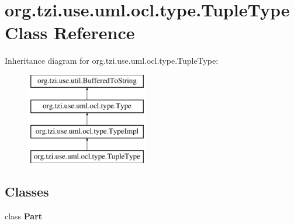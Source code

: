 \hypertarget{classorg_1_1tzi_1_1use_1_1uml_1_1ocl_1_1type_1_1_tuple_type}{\section{org.\-tzi.\-use.\-uml.\-ocl.\-type.\-Tuple\-Type Class Reference}
\label{classorg_1_1tzi_1_1use_1_1uml_1_1ocl_1_1type_1_1_tuple_type}
}
Inheritance diagram for org.\-tzi.\-use.\-uml.\-ocl.\-type.\-Tuple\-Type\-:\begin{figure}[H]
\begin{center}
\leavevmode
\includegraphics[height=4.000000cm]{classorg_1_1tzi_1_1use_1_1uml_1_1ocl_1_1type_1_1_tuple_type}
\end{center}
\end{figure}
\subsection*{Classes}
\begin{DoxyCompactItemize}
\item 
class {\bfseries Part}
\end{DoxyCompactItemize}
